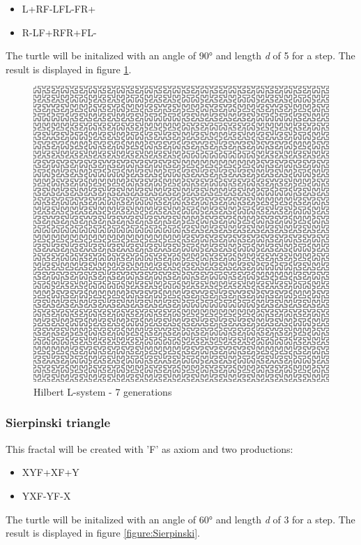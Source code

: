 \documentclass[english]{cpp-hmwk}
\begin{document}
\begin{itemize}
\item L\rightarrow +RF-LFL-FR+
\item R\rightarrow-LF+RFR+FL-
\end{itemize}


\noindent The turtle will be initalized with an angle of 90° and length \textit{d} of 5 for a step. The result is displayed in figure \ref{figure:Hilbert}.

\begin{figure}[h!]
	\centering
	\includegraphics[width=0.6\columnwidth]{../graphs/Examples/hilbert.png}
	\caption{Hilbert L-system - 7 generations}
	\label{figure:Hilbert}
\end{figure}
 

\subsubsection{Sierpinski triangle}
This fractal will be created with 'F' as axiom and two productions:

\begin{itemize}
\item X\rightarrow YF+XF+Y
\item Y\rightarrow XF-YF-X
\end{itemize}

\noindent The turtle will be initalized with an angle of 60° and length \textit{d} of 3 for a step. The result is displayed in figure \ref{figure:Sierpinski}.
 
\end{document}
